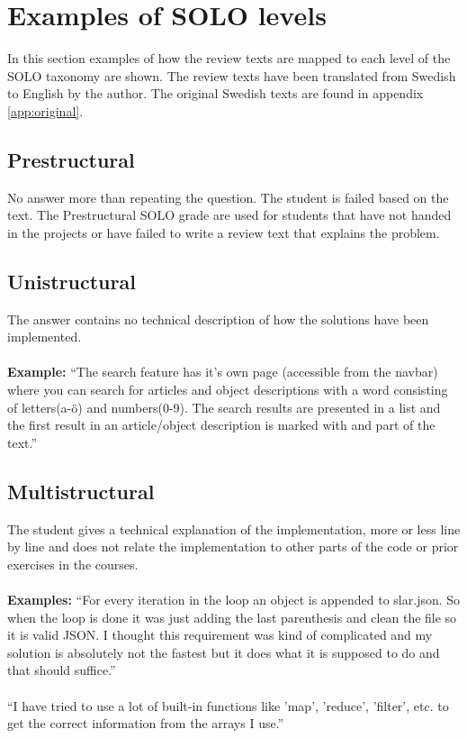 \documentclass[twoside,twocolumn,a4paper,11pt,english]{article}
\begin{document}
\section{Examples of SOLO levels} \label{sec:examples}

In this section examples of how the review texts are mapped to each level of the SOLO taxonomy are shown. The review texts have been translated from Swedish to English by the author. The original Swedish texts are found in appendix \ref{app:original}.

\subsection{Prestructural}

No answer more than repeating the question. The student is failed based on the text. The Prestructural SOLO grade are used for students that have not handed in the projects or have failed to write a review text that explains the problem.

\subsection{Unistructural}

The answer contains no technical description of how the solutions have been implemented.
\\
\\
\textbf{Example:} ``The search feature has it's own page (accessible from the navbar) where you can search for articles and object descriptions with a word consisting of letters(a-ö) and numbers(0-9). The search results are presented in a list and the first result in an article/object description is marked with and part of the text.''

\subsection{Multistructural}

The student gives a technical explanation of the implementation, more or less line by line and does not relate the implementation to other parts of the code or prior exercises in the courses.
\\
\\
\textbf{Examples:} ``For every iteration in the loop an object is appended to slar.json. So when the loop is done it was just adding the last parenthesis and clean the file so it is valid JSON. I thought this requirement was kind of complicated and my solution is absolutely not the fastest but it does what it is supposed to do and that should suffice.''
\\
\\
``I have tried to use a lot of built-in functions like 'map', 'reduce', 'filter', etc. to get the correct information from the arrays I use.''
\end{document}
